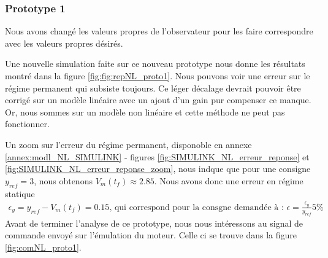 \subsubsection{Prototype 1}
Nous avons changé les valeurs propres de l'observateur pour les faire correspondre avec les valeurs propres désirés. 		
			
Une nouvelle simulation faite sur ce nouveau prototype nous donne les résultats montré dans la figure \ref{fig:fig:repNL_proto1}. Nous pouvons voir une erreur sur le régime permanent qui subsiste toujours. Ce léger décalage devrait pouvoir être corrigé sur un modèle linéaire avec un ajout d'un gain pur compenser ce manque. Or, nous sommes sur un modèle non linéaire et cette méthode ne peut pas fonctionner.


Un zoom sur l'erreur du régime permanent, disponoble en annexe \ref{annex:modl_NL_SIMULINK} - figures \ref{fig:SIMULINK_NL_erreur_reponse} et \ref{fig:SIMULINK_NL_erreur_reponse_zoom}, nous indque que pour une consigne $y_{ref} = 3$, nous obtenons $V_m(t_f)\approx 2.85$. Nous avons donc une erreur en régime statique \begin{align*}
\epsilon_y = y_{ref}-V_m(t_f) = 0.15 \text{, qui correspond pour la consgne demandée à : } \epsilon = \frac{\epsilon_y}{y_{ref}}5\%
\end{align*}
Avant de terminer l'analyse de ce prototype, nous nous intéressons au signal de commande envoyé sur l'émulation du moteur. Celle ci se trouve dans la figure \ref{fig:comNL_proto1}. 

